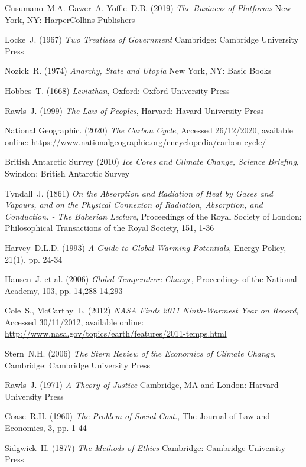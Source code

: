 \documentclass[11pt, oneside]{article}   	%
\begin{document}
\begin{thebibliography}{99}

 Cusumano~M.A. Gawer~A. Yoffie~D.B. (2019)
\emph{The Business of Platforms}
New York, NY: HarperCollins Publishers

 Locke~J. (1967)
\emph{Two Treatises of Government}
Cambridge: Cambridge University Press

 Nozick~R. (1974)
\emph{Anarchy, State and Utopia}
New York, NY: Basic Books

 Hobbes~T. (1668)
\emph{Leviathan},
Oxford: Oxford University Press

 Rawls~J. (1999)
\emph{The Law of Peoples},
Harvard: Havard University Press

 National Geographic. (2020)
\emph{The Carbon Cycle},
Accessed 26/12/2020, available online: 
\url{https://www.nationalgeographic.org/encyclopedia/carbon-cycle/}
	
 British Antarctic Survey (2010)
\emph{Ice Cores and Climate Change, Science Briefing},
Swindon: British Antarctic Survey
	
 Tyndall~J. (1861)
\emph{On the Absorption and Radiation of Heat by Gases and Vapours, and on the Physical Connexion of Radiation, Absorption, and Conduction. - The Bakerian Lecture},
Proceedings of the Royal Society of London; Philosophical Transactions of the Royal Society, 151, 1-36
	
 Harvey~D.L.D. (1993)
\emph{A Guide to Global Warming Potentials},
Energy Policy, 21(1), pp. 24-34
	
 Hansen~J. et al. (2006)
\emph{Global Temperature Change},
Proceedings of the National Academy, 103, pp. 14,288-14,293
	
 Cole~S., McCarthy~L. (2012)
\emph{NASA Finds 2011 Ninth-Warmest Year on Record},
Accessed 30/11/2012, available online: 
\url{http://www.nasa.gov/topics/earth/features/2011-temps.html}
	
 Stern~N.H. (2006)
\emph{The Stern Review of the Economics of Climate Change},
Cambridge: Cambridge University Press
	
 Rawls~J. (1971)
\emph{A Theory of Justice}
Cambridge, MA and London: Harvard University Press
	
 Coase~R.H. (1960)
\emph{The Problem of Social Cost.},
The Journal of Law and Economics, 3, pp. 1-44
	
 Sidgwick~H. (1877)
\emph{The Methods of Ethics}
Cambridge: Cambridge University Press
	

\end{thebibliography}
\end{document}
